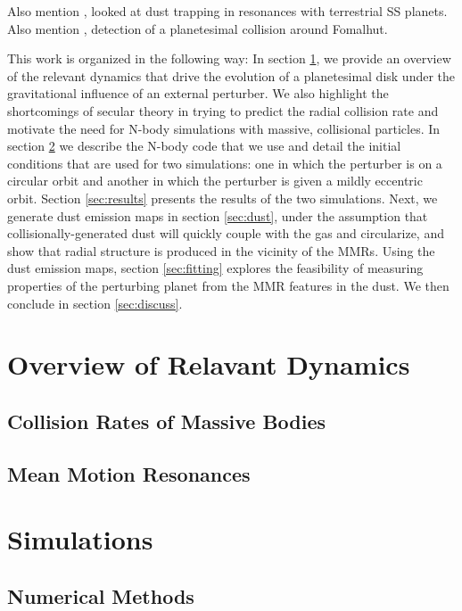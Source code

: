 \documentclass[onecolumn]{aastex63}
\begin{document}
Also mention \citet{2020A&A...635A..10S}, looked at dust trapping in resonances with terrestrial SS planets. Also mention 
\citet{2020arXiv200408736G}, detection of a planetesimal collision around Fomalhut.

This work is organized in the following way: In section \ref{sec:dynamics}, we provide an overview of the relevant dynamics that drive 
the evolution of a planetesimal disk under the gravitational influence of an external perturber. We also highlight the shortcomings of secular theory in trying to predict the radial collision rate and motivate the need for N-body simulations with massive, collisional particles. In section \ref{sec:sims} we describe the N-body code that we use and detail the initial conditions that are used for two simulations: one in which the perturber is on a circular orbit and another in which the perturber is given a mildly eccentric orbit. Section \ref{sec:results} presents the results of the two simulations. Next, we generate dust emission maps in section \ref{sec:dust}, under the assumption that collisionally-generated dust will quickly couple with the gas and circularize, and show that radial structure is produced in the vicinity of the MMRs. Using the dust emission maps, section \ref{sec:fitting} explores the feasibility of measuring properties of the perturbing planet from the MMR features in the dust. We then conclude in section \ref{sec:discuss}. 

\section{Overview of Relavant Dynamics} \label{sec:dynamics}

\subsection{Collision Rates of Massive Bodies}

\subsection{Mean Motion Resonances}

\section{Simulations} \label{sec:sims}

\subsection{Numerical Methods}\label{sec:methods}
\end{document}
